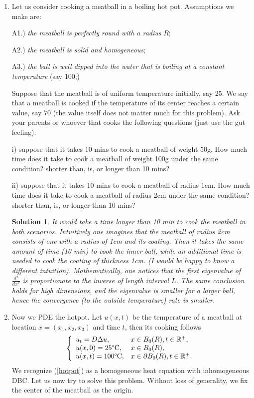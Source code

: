 \documentclass[6pt]{article}
\newtheorem{solution}{Solution}
\numberwithin{equation}{section}
\def\mathbb{\Bbb}
\begin{document}
\begin{enumerate}
\item Let us consider cooking a meatball in a boiling hot pot.  Assumptions we make are:

A1.) \emph{the meatball is perfectly round with a radius} $R$;

A2.) \emph{the meatball is solid and homogeneous};

A3.) \emph{the ball is well dipped into the water that is boiling at a constant temperature} (say 100;)

Suppose that the meatball is of uniform temperature initially, say 25.  We say that a meatball is cooked if the temperature of its center reaches a certain value, say 70  (the value itself does not matter much for this problem).
Ask your parents or whoever that cooks the following questions (just use the gut feeling):

i) suppose that it takes 10 mins to cook a meatball of weight 50g.  How much time does it take to cook a meatball of weight 100g under the same condition? shorter than, is, or longer than 10 mins?

ii) suppose that it takes 10 mins to cook a meatball of radius 1cm.  How much time does it take to cook a meatball of radius 2cm under the same condition?  shorter than, is, or longer than 10 mins?
\begin{solution}
It would take a time longer than 10 min to cook the meatball in both scenarios.  Intuitively one imagines that the meatball of radius 2cm consists of one with a radius of 1cm and its coating.  Then it takes the same amount of time (10 min) to cook the inner ball, while an additional time is needed to cook the coating of thickness 1cm.  (I would be happy to know a different intuition).  Mathematically, one notices that the first eigenvalue of $\frac{d^2}{dx^2}$ is proportionate to the inverse of length interval $L$.  The same conclusion holds for high dimensions, and the eigenvalue is smaller for a larger ball, hence the convergence (to the outside temperature) rate is smaller.
\end{solution}


\item Now we PDE the hotpot.  Let $u(x,t)$ be the temperature of a meatball at location $x=(x_1,x_2,x_3)$ and time $t$, then its cooking follows
\begin{equation}\label{hotpot}
\left\{
\begin{array}{ll}
u_t=D\Delta u,& x\in B_0(R),t\in\mathbb R^+,\\
u(x,0)=25 \text{\textdegree{C}},&x\in B_0(R),\\
u(x,t)=100 \text{\textdegree{C}}, &x\in\partial B_0(R), t\in\mathbb R^+.
\end{array}
\right.
\end{equation}
We recognize (\ref{hotpot}) as a homogeneous heat equation with inhomogeneous DBC.  Let us now try to solve this problem.  Without loss of generality, we fix the center of the meatball as the origin.


\end{enumerate}
\end{document}
